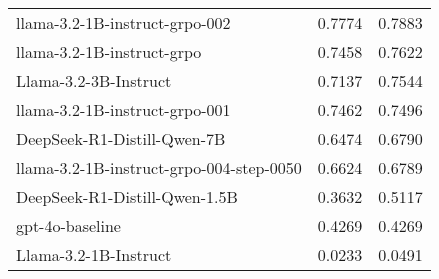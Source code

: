 \begin{tabular}{lrr}
llama-3.2-1B-instruct-grpo-002 & 0.7774 & 0.7883 \\
llama-3.2-1B-instruct-grpo & 0.7458 & 0.7622 \\
Llama-3.2-3B-Instruct & 0.7137 & 0.7544 \\
llama-3.2-1B-instruct-grpo-001 & 0.7462 & 0.7496 \\
DeepSeek-R1-Distill-Qwen-7B & 0.6474 & 0.6790 \\
llama-3.2-1B-instruct-grpo-004-step-0050 & 0.6624 & 0.6789 \\
DeepSeek-R1-Distill-Qwen-1.5B & 0.3632 & 0.5117 \\
gpt-4o-baseline & 0.4269 & 0.4269 \\
Llama-3.2-1B-Instruct & 0.0233 & 0.0491 \\
\bottomrule
\end{tabular}
